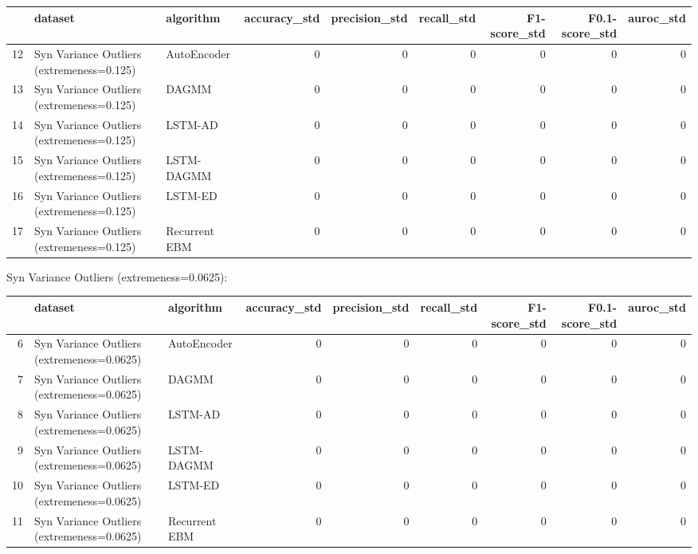 \begin{tabular}{rllrrrrrr}
\hline
    & dataset                                   & algorithm     &   accuracy\_std &   precision\_std &   recall\_std &   F1-score\_std &   F0.1-score\_std &   auroc\_std \\
\hline
 12 & Syn Variance Outliers (extremeness=0.125) & AutoEncoder   &              0 &               0 &            0 &              0 &                0 &           0 \\
 13 & Syn Variance Outliers (extremeness=0.125) & DAGMM         &              0 &               0 &            0 &              0 &                0 &           0 \\
 14 & Syn Variance Outliers (extremeness=0.125) & LSTM-AD       &              0 &               0 &            0 &              0 &                0 &           0 \\
 15 & Syn Variance Outliers (extremeness=0.125) & LSTM-DAGMM    &              0 &               0 &            0 &              0 &                0 &           0 \\
 16 & Syn Variance Outliers (extremeness=0.125) & LSTM-ED       &              0 &               0 &            0 &              0 &                0 &           0 \\
 17 & Syn Variance Outliers (extremeness=0.125) & Recurrent EBM &              0 &               0 &            0 &              0 &                0 &           0 \\
\hline
\end{tabular}

Syn Variance Outliers (extremeness=0.0625):

\begin{tabular}{rllrrrrrr}
\hline
    & dataset                                    & algorithm     &   accuracy\_std &   precision\_std &   recall\_std &   F1-score\_std &   F0.1-score\_std &   auroc\_std \\
\hline
  6 & Syn Variance Outliers (extremeness=0.0625) & AutoEncoder   &              0 &               0 &            0 &              0 &                0 &           0 \\
  7 & Syn Variance Outliers (extremeness=0.0625) & DAGMM         &              0 &               0 &            0 &              0 &                0 &           0 \\
  8 & Syn Variance Outliers (extremeness=0.0625) & LSTM-AD       &              0 &               0 &            0 &              0 &                0 &           0 \\
  9 & Syn Variance Outliers (extremeness=0.0625) & LSTM-DAGMM    &              0 &               0 &            0 &              0 &                0 &           0 \\
 10 & Syn Variance Outliers (extremeness=0.0625) & LSTM-ED       &              0 &               0 &            0 &              0 &                0 &           0 \\
 11 & Syn Variance Outliers (extremeness=0.0625) & Recurrent EBM &              0 &               0 &            0 &              0 &                0 &           0 \\
\hline
\end{tabular}


